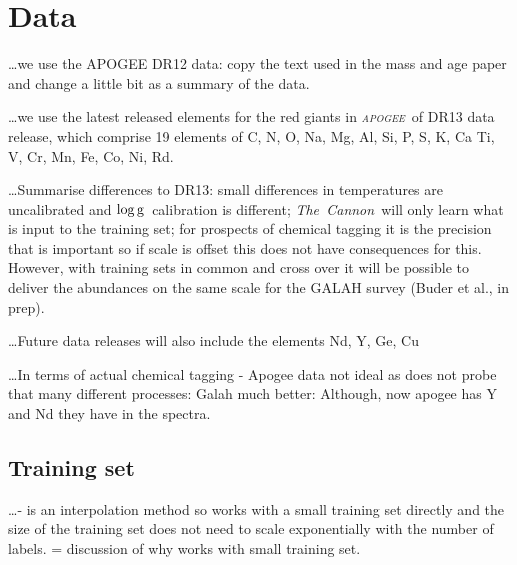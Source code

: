 \documentclass[12pt, preprint]{aastex}
\newcommand{\project}[1]{\textsl{#1}}
\newcommand{\tc}{\project{The~Cannon}}
\newcommand{\apogee}{\project{\textsc{apogee}}}
\newcommand{\logg}{\mbox{$\rm \log g$}}
\begin{document}


\section{Data}

\ldots we use the APOGEE DR12 data: copy the text used in the mass and age paper and change a little bit as a summary of the data. 

\ldots we use the latest released elements for the red giants in \apogee\ of DR13 data release, which comprise 19 elements of C, N, O, Na, Mg, Al, Si, P, S, K, Ca
Ti, V, Cr, Mn, Fe, Co, Ni, Rd. 

\ldots Summarise differences to DR13: small differences in temperatures are uncalibrated and \logg\ calibration is different; \tc\ will only learn what is input to the training set; for prospects of chemical tagging it is the precision that is important so if scale is offset this does not have consequences for this. However, with training sets in common and cross over it will be possible to deliver the abundances on the same scale for the GALAH survey (Buder et al., in prep). 

\ldots Future data releases will also include the elements Nd, Y, Ge, Cu

\ldots In terms of actual chemical tagging - Apogee data not ideal as does not probe that many different processes: Galah much better: Although, now apogee has Y and Nd they have in the spectra.  

\subsection{Training set} 

\ldots - is an interpolation method so works with a small training set directly and the size of the training set does not need to scale exponentially with the number of labels. = discussion of why works with small training set. 
\end{document}

